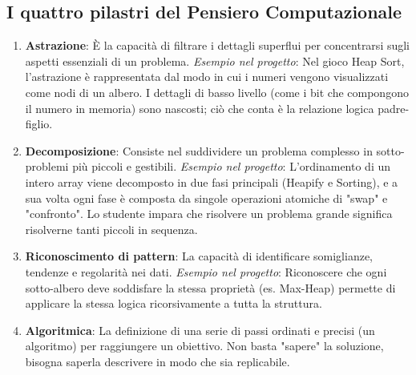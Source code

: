 \documentclass[openany]{theme/uniprthesis}
\begin{document}
\subsection{I quattro pilastri del Pensiero Computazionale}
\begin{enumerate}
    \item \textbf{Astrazione}: È la capacità di filtrare i dettagli superflui per concentrarsi sugli aspetti essenziali di un problema. 
    \textit{Esempio nel progetto}: Nel gioco Heap Sort, l'astrazione è rappresentata dal modo in cui i numeri vengono visualizzati come nodi di un albero. I dettagli di basso livello (come i bit che compongono il numero in memoria) sono nascosti; ciò che conta è la relazione logica padre-figlio.
    
    \item \textbf{Decomposizione}: Consiste nel suddividere un problema complesso in sotto-problemi più piccoli e gestibili.
    \textit{Esempio nel progetto}: L'ordinamento di un intero array viene decomposto in due fasi principali (Heapify e Sorting), e a sua volta ogni fase è composta da singole operazioni atomiche di "swap" e "confronto". Lo studente impara che risolvere un problema grande significa risolverne tanti piccoli in sequenza.
    
    \item \textbf{Riconoscimento di pattern}: La capacità di identificare somiglianze, tendenze e regolarità nei dati.
    \textit{Esempio nel progetto}: Riconoscere che ogni sotto-albero deve soddisfare la stessa proprietà (es. Max-Heap) permette di applicare la stessa logica ricorsivamente a tutta la struttura.
    
    \item \textbf{Algoritmica}: La definizione di una serie di passi ordinati e precisi (un algoritmo) per raggiungere un obiettivo. Non basta "sapere" la soluzione, bisogna saperla descrivere in modo che sia replicabile.
\end{enumerate}
\end{document}

